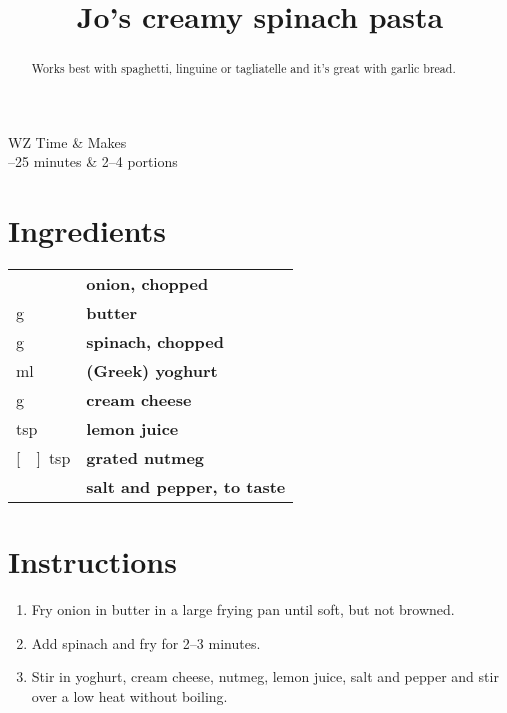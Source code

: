 \documentclass[main.tex]{subfiles}
\title{Jo's creamy spinach pasta}
\begin{document}
\maketitle%

\begin{margintable}
\begin{tabularx}{\textwidth}{WZ}
Time & Makes\\ 
--25 minutes & 2--4 portions\\
\end{tabularx}
\end{margintable}

\begin{abstract}
Works best with spaghetti, linguine or tagliatelle and it’s great with garlic bread. 
\end{abstract}

\section{Ingredients}

\vspace*{-\baselineskip}
\begin{table}[ht]
	\begin{tabularx}{\textwidth}{>{\hsize=0.333\hsize}X>{\bf\hsize=1\hsize}X}
	\unit[1]{} & onion, chopped \\
	\unit[50]{g} & butter \\
	\unit[115]{g} & spinach, chopped\\
	\unit[150]{ml} & (Greek) yoghurt\\
	\unit[125]{g} & cream cheese \\
	\unit[1]{tsp} & lemon juice \\
	\unit[\nicefrac{1}{4}]{tsp} & grated nutmeg \\
    \unit[]{} & salt and pepper, to taste
	\end{tabularx}
\end{table}

\section{Instructions}

\begin{enumerate}	
	\item Fry onion in butter in a large frying pan until soft, but not browned.
	
	\item Add spinach and fry for 2--3 minutes.
	
	\item Stir in yoghurt, cream cheese, nutmeg, lemon juice, salt and pepper and stir over a low heat without boiling.
	
\end{enumerate}


\end{document}
